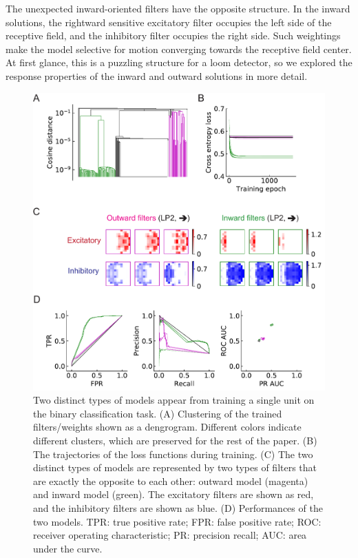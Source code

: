\documentclass[pdftex,9pt,lineno]{elife}
\begin{document}
The unexpected inward-oriented filters have the opposite structure. In the inward solutions, the rightward sensitive excitatory filter occupies the left side of the receptive field, and the inhibitory filter occupies the right side. Such weightings make the model selective for motion converging towards the receptive field center. At first glance, this is a puzzling structure for a loom detector, so we explored the response properties of the inward and outward solutions in more detail.

\begin{figure}
\includegraphics[width=\linewidth]{figures/trained_results_Q1_paper.pdf}
\caption{Two distinct types of models appear from training a single unit on the binary classification task. (A) Clustering of the trained filters/weights shown as a dengrogram. Different colors indicate different clusters, which are preserved for the rest of the paper. (B) The trajectories of the loss functions during training. (C) The two distinct types of models are represented by two types of filters that are exactly the opposite to each other: outward model (magenta) and inward model (green). The excitatory filters are shown as red, and the inhibitory filters are shown as blue. (D) Performances of the two models. TPR: true positive rate; FPR: false positive rate; ROC: receiver operating characteristic; PR: precision recall; AUC: area under the curve.}

\end{figure}
\end{document}
